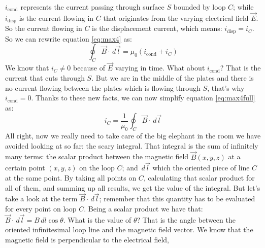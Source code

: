 $i_{\text{cond}}$ represents the current passing through surface $S$ bounded by loop $C$;
while $i_{\text{disp}}$ is the current flowing in $C$ that originates from
the varying electrical field $\vec{E}$. So the current flowing in $C$ is the
displacement current, which means: $i_{\text{disp}} = i_C$.
So we can rewrite equation \ref{eq:max4} as:
\begin{equation}
    \label{eq:max4full}
    \oint_C \vec{B} \cdot \,d \vec{l} = \mu_0 (i_{\text{cond}} + i_C)
\end{equation}
We know that $i_C \neq 0$ because of $\vec{E}$ varying
in time. What about $i_{\text{cond}}$? That is the current that cuts through $S$. But
we are in the middle of the plates and there is no current flowing between the plates
which is flowing through $S$, that's why $i_{\text{cond}} = 0$. Thanks to these new
facts, we can now simplify equation \ref{eq:max4full} as:
\begin{equation}
    \label{eq:max4slim}
    i_C = \frac{1}{\mu_0}\oint_C \vec{B} \cdot \,d \vec{l}
\end{equation}
All right, now we really need to take care of the big elephant in the room we have
avoided looking at so far: the scary integral.
That integral is the sum of infinitely many terms: the scalar product between
the magnetic field $\vec{B}(x,y,z)$ at a certain point $(x,y,z)$ on the
loop $C$; and $\,d \vec{l}$ which the oriented piece of line $C$ at the same point.
By taking all points on $C$, calculating that scalar product for all of them, and
summing up all results, we get the value of the integral. But let's take a look at the
term $\vec{B} \cdot \,d \vec{l}$; remember that this quantity has to be evaluated for
every point on loop $C$. Being a scalar
product
we have that:
$\vec{B} \cdot \,d \vec{l} = B \,d l \cos\theta$.
What is the value of $\theta$? That is the angle between the oriented infinitesimal
loop line and the magnetic field vector. We know that the magnetic field is
perpendicular to the
electrical field,
